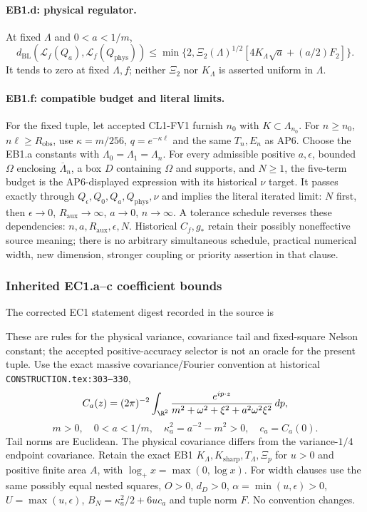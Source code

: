 \paragraph{EB1.d: physical regulator.}
At fixed $\Lambda$ and $0<a<1/m$,
\[
 d_{\mathrm{BL}}(\mathcal L_f(Q_a),\mathcal L_f(Q_{\mathrm{phys}}))
 \le\min\{2,\Xi_2(\Lambda)^{1/2}[4K_\Lambda\sqrt a+(a/2)F_2]\}.
\]
It tends to zero at fixed $\Lambda,f$; neither $\Xi_2$ nor $K_\Lambda$
is asserted uniform in $\Lambda$.

\paragraph{EB1.f: compatible budget and literal limits.}
For the fixed tuple, let accepted CL1-FV1 furnish $n_0$ with
$K\subset\Lambda_{n_0}$. For $n\ge n_0$, $n\ell\ge R_{\mathrm{obs}}$,
use $\kappa=m/256$, $q=e^{-\kappa\ell}$ and the same $T_n,E_n$ as AP6.
Choose the EB1.a constants with $\Lambda_0=\Lambda_1=\Lambda_n$.
For every admissible positive $a,\epsilon$, bounded $\Omega$ enclosing
$\overline\Lambda_n$, a box $D$ containing $\Omega$ and supports, and
$N\ge1$, the five-term budget is the AP6-displayed expression with its
historical $\nu$ target. It passes exactly through
$Q_\epsilon,Q_0,Q_a,Q_{\mathrm{phys}},\nu$ and implies the literal
iterated limit: $N$ first, then $\epsilon\to0$, $R_{\mathrm{aux}}\to\infty$,
$a\to0$, $n\to\infty$. A tolerance schedule reverses these dependencies:
$n,a,R_{\mathrm{aux}},\epsilon,N$.
Historical $C_f,g_*$ retain their possibly noneffective source meaning;
there is no arbitrary simultaneous schedule, practical numerical width,
new dimension, stronger coupling or priority assertion in that clause.

\subsubsection{Inherited EC1.a--c coefficient bounds}
The corrected EC1 statement digest recorded in the source is
\par{}\par
These are rules for the physical variance, covariance tail and fixed-square
Nelson constant; the accepted positive-accuracy selector is not an oracle
for the present tuple. Use the exact massive covariance/Fourier convention
at historical \texttt{CONSTRUCTION.tex:303--330},
\[
 C_a(z)=(2\pi)^{-2}\int_{\R^2}
 \frac{e^{ip\cdot z}}{m^2+\omega^2+\xi^2+a^2\omega^2\xi^2}\,dp,
\]
\[m>0,\quad0<a<1/m,\quad\kappa_a^2=a^{-2}-m^2>0,\quad c_a=C_a(0).
\]
Tail norms are Euclidean. The physical covariance differs from the
variance-$1/4$ endpoint covariance. Retain the exact EB1
$K_\Lambda,K_{\mathrm{sharp}},T_\Lambda,\Xi_p$ for $u>0$ and positive
finite area $A$, with $\log_+x=\max(0,\log x)$.
For width clauses use the same possibly equal nested squares, $O>0$,
$d_D>0$, $\alpha=\min(u,\epsilon)>0$, $U=\max(u,\epsilon)$,
$B_N=\kappa_a^2/2+6uc_a$ and tuple norm $F$. No convention changes.

